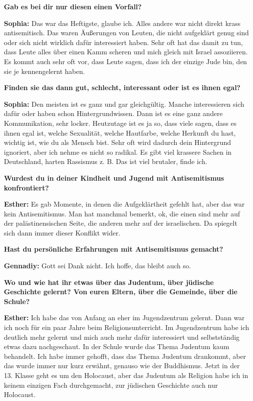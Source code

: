 \textbf{Gab es bei dir nur diesen einen Vorfall?} 

\textbf{Sophia:} Das war das Heftigste, glaube ich. Alles andere war nicht direkt krass antisemitisch. Das waren Äußerungen von Leuten, die nicht aufgeklärt genug sind oder sich nicht wirklich dafür interessiert haben. Sehr oft hat das damit zu tun, dass Leute alles über einen Kamm scheren und mich gleich mit Israel assoziieren. Es kommt auch sehr oft vor, dass Leute sagen, dass ich der einzige Jude bin, den sie je kennengelernt haben. 

\textbf{Finden sie das dann gut, schlecht, interessant oder ist es ihnen egal?} 

\textbf{Sophia:} Den meisten ist es ganz und gar gleichgültig. Manche interessieren sich dafür oder haben schon Hintergrundwissen. Dann ist es eine ganz andere Kommunikation, sehr locker. Heutzutage ist es ja so, dass viele sagen, dass es ihnen egal ist, welche Sexualität, welche Hautfarbe, welche Herkunft du hast, wichtig ist, wie du als Mensch bist. Sehr oft wird dadurch dein Hintergrund ignoriert, aber ich nehme es nicht so radikal. Es gibt viel krassere Sachen in Deutschland, harten Rassismus z. B. Das ist viel brutaler, finde ich.  

\textbf{Wurdest du in deiner Kindheit und Jugend mit Antisemitismus konfrontiert?} 

\textbf{Esther:} Es gab Momente, in denen die Aufgeklärtheit gefehlt hat, aber das war kein Antisemitismus. Man hat manchmal bemerkt, ok, die einen sind mehr auf der palästinensischen Seite, die anderen mehr auf der israelischen. Da spiegelt sich dann immer dieser Konflikt wider.  

\textbf{Hast du persönliche Erfahrungen mit Antisemitismus gemacht?} 

\textbf{Gennadiy:} Gott sei Dank nicht. Ich hoffe, das bleibt auch so.  

\textbf{Wo und wie hat ihr etwas über das Judentum, über jüdische Geschichte gelernt? Von euren Eltern, über die Gemeinde, über die Schule?} 

\textbf{Esther:} Ich habe das von Anfang an eher im Jugendzentrum gelernt. Dann war ich noch für ein paar Jahre beim Religionsunterricht. Im Jugendzentrum habe ich deutlich mehr gelernt und mich auch mehr dafür interessiert und selbstständig etwas dazu nachgeschaut. In der Schule wurde das Thema Judentum kaum behandelt. Ich habe immer gehofft, dass das Thema Judentum drankommt, aber das wurde immer nur kurz erwähnt, genauso wie der Buddhismus. Jetzt in der 13. Klasse geht es um den Holocaust, aber das Judentum als Religion habe ich in keinem einzigen Fach durchgemacht, zur jüdischen Geschichte auch nur Holocaust. 

